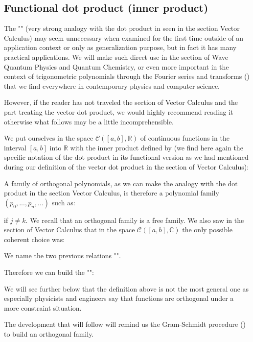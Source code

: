 	\subsection{Functional dot product (inner product)}\label{functional dot product}
	The "" (very strong analogy with the dot product in seen in the section Vector Calculus) may seem unnecessary when examined for the first time outside of an application context or only as generalization purpose, but in fact it has many practical applications. We will make such direct use in the section of Wave Quantum Physics and Quantum Chemistry, or even more important in the context of trigonometric polynomials through the Fourier series and transforms () that we find everywhere in contemporary physics and computer science.
	
	However, if the reader has not traveled the section of Vector Calculus and the part treating the vector dot product, we would highly recommend reading it otherwise what follows may be a little incomprehensible.
	
	We put ourselves in the space $\mathcal{C}([a,b],\mathbb{R})$ of continuous functions in the interval $[a, b]$ into $\mathbb{R}$ with the inner product defined by (we find here again the specific notation of the dot product in its functional version as we had mentioned during our definition of the vector dot product in the section of Vector Calculus):
	
	A family of orthogonal polynomials, as we can make the analogy with the dot product in the section Vector Calculus, is therefore a polynomial family $(p_0,...,p_n,...)$ such as:
	
	if $j \ne k$. We recall that an orthogonal family is a free family. We also saw in the section of Vector Calculus that in the space $\mathcal{C}([a,b],\mathbb{C})$ the only possible coherent choice was:
	
	
	We name the two previous relations "".
	
	Therefore we can build the "":
	
	\begin{tcolorbox}[title=Remark,colframe=black,arc=10pt]
	We will see further below that the definition above is not the most general one as especially physicists and engineers say that functions are orthogonal under a more constraint situation.
	\end{tcolorbox}
	The development that will follow will remind us the Gram-Schmidt procedure () to build an orthogonal family.
	
